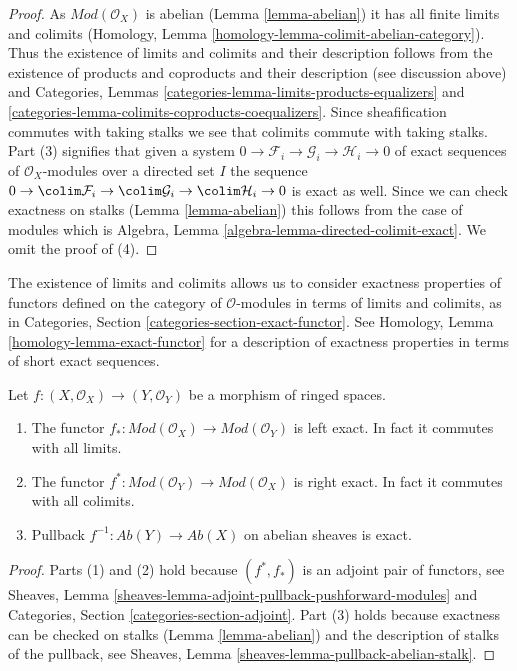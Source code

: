 \begin{proof}
As $\textit{Mod}(\mathcal{O}_X)$ is abelian (Lemma \ref{lemma-abelian})
it has all finite limits and colimits
(Homology, Lemma \ref{homology-lemma-colimit-abelian-category}).
Thus the existence of limits and colimits and their description follows from
the existence of products and coproducts and their description
(see discussion above) and
Categories, Lemmas \ref{categories-lemma-limits-products-equalizers} and
\ref{categories-lemma-colimits-coproducts-coequalizers}.
Since sheafification commutes with taking stalks we see that
colimits commute with taking stalks. Part (3) signifies that given
a system $0 \to \mathcal{F}_i \to \mathcal{G}_i \to \mathcal{H}_i \to 0$
of exact sequences of $\mathcal{O}_X$-modules over a directed set $I$
the sequence $0 \to \colim \mathcal{F}_i \to \colim \mathcal{G}_i \to
\colim \mathcal{H}_i \to 0$ is exact as well. Since we can check
exactness on stalks (Lemma \ref{lemma-abelian}) this follows from the case
of modules which is
Algebra, Lemma \ref{algebra-lemma-directed-colimit-exact}.
We omit the proof of (4).
\end{proof}

\noindent
The existence of limits and colimits
allows us to consider exactness properties of
functors defined on the category of $\mathcal{O}$-modules
in terms of limits and colimits, as in
Categories, Section \ref{categories-section-exact-functor}.
See Homology, Lemma \ref{homology-lemma-exact-functor} for a
description of exactness
properties in terms of short exact sequences.

\begin{lemma}
\label{lemma-exactness-pushforward-pullback}
Let $f : (X, \mathcal{O}_X) \to (Y, \mathcal{O}_Y)$
be a morphism of ringed spaces.
\begin{enumerate}
\item The functor
$f_* : \textit{Mod}(\mathcal{O}_X) \to \textit{Mod}(\mathcal{O}_Y)$
is left exact. In fact it commutes with all limits.
\item The functor
$f^* : \textit{Mod}(\mathcal{O}_Y) \to \textit{Mod}(\mathcal{O}_X)$
is right exact. In fact it commutes with all colimits.
\item Pullback $f^{-1} : \textit{Ab}(Y) \to \textit{Ab}(X)$
on abelian sheaves is exact.
\end{enumerate}
\end{lemma}

\begin{proof}
Parts (1) and (2) hold because $(f^*, f_*)$ is an adjoint pair
of functors, see
Sheaves, Lemma \ref{sheaves-lemma-adjoint-pullback-pushforward-modules}
and
Categories, Section \ref{categories-section-adjoint}.
Part (3) holds because exactness can be checked on stalks
(Lemma \ref{lemma-abelian})
and the description of stalks of the pullback, see
Sheaves, Lemma \ref{sheaves-lemma-pullback-abelian-stalk}.
\end{proof}

